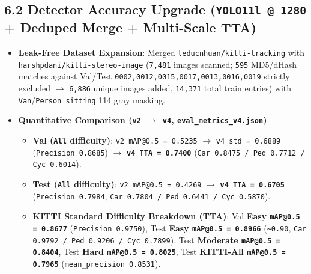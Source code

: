 \documentclass[10.5pt,a4paper]{article}
\begin{document}
\subsection{6.2 Detector Accuracy Upgrade (\texttt{YOLO11l @ 1280} + Deduped Merge + Multi-Scale TTA)}
\begin{itemize}[leftmargin=1.5em,itemsep=2pt]
\item \textbf{Leak-Free Dataset Expansion}: Merged \texttt{leducnhuan/\allowbreak{}kitti-\allowbreak{}tracking} with \texttt{harshpdani/\allowbreak{}kitti-\allowbreak{}stereo-\allowbreak{}image} (\texttt{7,\allowbreak{}481} images scanned; \texttt{595} MD5/dHash matches against Val/Test \texttt{0002,\allowbreak{}0012,\allowbreak{}0015,\allowbreak{}0017,\allowbreak{}0013,\allowbreak{}0016,\allowbreak{}0019} strictly excluded $\rightarrow$ \texttt{6,\allowbreak{}886} unique images added, \texttt{14,\allowbreak{}371} total train entries) with \texttt{Van}/\texttt{Person\_\allowbreak{}sitting} 114 gray masking.
\item \textbf{Quantitative Comparison (\texttt{v2 $\rightarrow$ v4}, \href{https://github.com/Heisnotanimposter/Totalcare\_autonomous\_driving\_Yolov5/blob/main/results/v4\_road\_lane/detect\_outputs/outputs/eval\_metrics\_v4.json}{\texttt{eval\_\allowbreak{}metrics\_\allowbreak{}v4.\allowbreak{}json}})}:
\begin{itemize}[leftmargin=1.5em,itemsep=2pt]
\item \textbf{Val (\texttt{All} difficulty)}: \texttt{v2 mAP@0.\allowbreak{}5 = 0.\allowbreak{}5235} $\rightarrow$ \texttt{v4 std = 0.\allowbreak{}6889} (\texttt{Precision 0.\allowbreak{}8685}) $\rightarrow$ \textbf{\texttt{v4 TTA = 0.\allowbreak{}7400}} (\texttt{Car 0.\allowbreak{}8475 /\allowbreak{} Ped 0.\allowbreak{}7712 /\allowbreak{} Cyc 0.\allowbreak{}6014}).
\item \textbf{Test (\texttt{All} difficulty)}: \texttt{v2 mAP@0.\allowbreak{}5 = 0.\allowbreak{}4269} $\rightarrow$ \textbf{\texttt{v4 TTA = 0.\allowbreak{}6705}} (\texttt{Precision 0.\allowbreak{}7984}, \texttt{Car 0.\allowbreak{}7804 /\allowbreak{} Ped 0.\allowbreak{}6441 /\allowbreak{} Cyc 0.\allowbreak{}5870}).
\item \textbf{KITTI Standard Difficulty Breakdown (TTA)}: Val \textbf{Easy \texttt{mAP@0.\allowbreak{}5 = 0.\allowbreak{}8677}} (\texttt{Precision 0.\allowbreak{}9750}), Test \textbf{Easy \texttt{mAP@0.\allowbreak{}5 = 0.\allowbreak{}8966}} (\texttt{\textasciitilde{}0.\allowbreak{}90}, \texttt{Car 0.\allowbreak{}9792 /\allowbreak{} Ped 0.\allowbreak{}9206 /\allowbreak{} Cyc 0.\allowbreak{}7899}), Test \textbf{Moderate \texttt{mAP@0.\allowbreak{}5 = 0.\allowbreak{}8404}}, Test \textbf{Hard \texttt{mAP@0.\allowbreak{}5 = 0.\allowbreak{}8025}}, Test \textbf{KITTI-All \texttt{mAP@0.\allowbreak{}5 = 0.\allowbreak{}7965}} (\texttt{mean\_\allowbreak{}precision 0.\allowbreak{}8531}).

\end{itemize}
\end{itemize}
\end{document}
